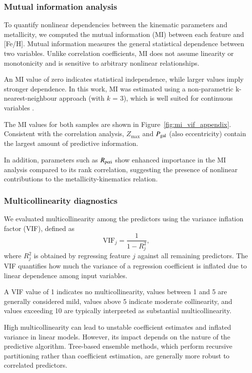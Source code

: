 \documentclass{aa}
\begin{document}
\begin{appendix}
\subsubsection{Mutual information analysis}

To quantify nonlinear dependencies between the kinematic parameters and metallicity,
we computed the mutual information (MI) between each feature and [Fe/H].
Mutual information measures the general statistical dependence between two variables. Unlike correlation coefficients, MI does not assume linearity or monotonicity and is sensitive to arbitrary nonlinear relationships.

An MI value of zero indicates statistical independence, while larger values imply stronger dependence. In this work, MI was estimated using a non-parametric k-nearest-neighbour approach (with $k$ = 3), which is well suited for continuous variables \citep{kraskov2004}.


The MI values for both samples are shown in Figure~\ref{fig:mi_vif_appendix}. Consistent with the correlation analysis, $Z_{\max}$ and $P_{\rm gal}$ (also eccentricity) contain the largest amount of predictive information.

In addition, parameters such as $R_{\rm peri}$ show enhanced importance in the MI analysis compared to its rank correlation, suggesting the presence of nonlinear contributions to the metallicity-kinematics relation.



\subsubsection{Multicollinearity diagnostics}

We evaluated multicollinearity among the predictors using the variance inflation factor (VIF), defined as
\begin{equation}
\mathrm{VIF}_j = \frac{1}{1 - R_j^2},
\end{equation}
where $R_j^2$ is obtained by regressing feature $j$ against all remaining predictors. The VIF quantifies how much the variance of a regression coefficient is inflated due to linear dependence among input variables.

A VIF value of 1 indicates no multicollinearity, values between 1 and 5 are generally considered mild, values above 5 indicate moderate collinearity, and values exceeding 10 are typically interpreted as substantial multicollinearity.

High multicollinearity can lead to unstable coefficient estimates and inflated variance in linear models. However, its impact depends on the nature of the predictive algorithm. Tree-based ensemble methods, which perform recursive partitioning rather than coefficient estimation, are generally more robust to correlated predictors.


\end{appendix}
\end{document}
